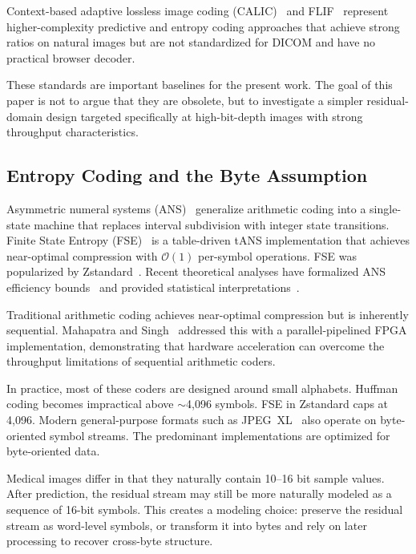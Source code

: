 \documentclass[journal]{IEEEtran}
\begin{document}
Context-based adaptive lossless image coding (CALIC)~\cite{wu1997} and
FLIF~\cite{sneyers2016} represent higher-complexity predictive and entropy
coding approaches that achieve strong ratios on natural images but are not
standardized for DICOM and have no practical browser decoder.

These standards are important baselines for the present work. The goal of this
paper is not to argue that they are obsolete, but to investigate a simpler
residual-domain design targeted specifically at high-bit-depth images with
strong throughput characteristics.

\subsection{Entropy Coding and the Byte Assumption}

Asymmetric numeral systems (ANS)~\cite{duda2009,duda2013} generalize arithmetic
coding into a single-state machine that replaces interval subdivision with
integer state transitions. Finite State Entropy (FSE)~\cite{fse} is a
table-driven tANS implementation that achieves near-optimal compression with
$\mathcal{O}(1)$ per-symbol operations. FSE was popularized by
Zstandard~\cite{rfc8878}. Recent theoretical analyses have formalized ANS
efficiency bounds~\cite{kosolobov2022} and provided statistical
interpretations~\cite{bamler2022}.

Traditional arithmetic coding achieves near-optimal compression but is
inherently sequential. Mahapatra and Singh~\cite{mahapatra2007} addressed this
with a parallel-pipelined FPGA implementation, demonstrating that hardware
acceleration can overcome the throughput limitations of sequential arithmetic
coders.

In practice, most of these coders are designed around small alphabets. Huffman
coding becomes impractical above ${\sim}$4,096 symbols. FSE in Zstandard caps
at 4,096. Modern general-purpose formats such as JPEG~XL~\cite{jpegxl} also
operate on byte-oriented symbol streams. The predominant implementations are
optimized for byte-oriented data.

Medical images differ in that they naturally contain 10--16 bit sample values.
After prediction, the residual stream may still be more naturally modeled as a
sequence of 16-bit symbols. This creates a modeling choice: preserve the
residual stream as word-level symbols, or transform it into bytes and rely on
later processing to recover cross-byte structure.
\end{document}
